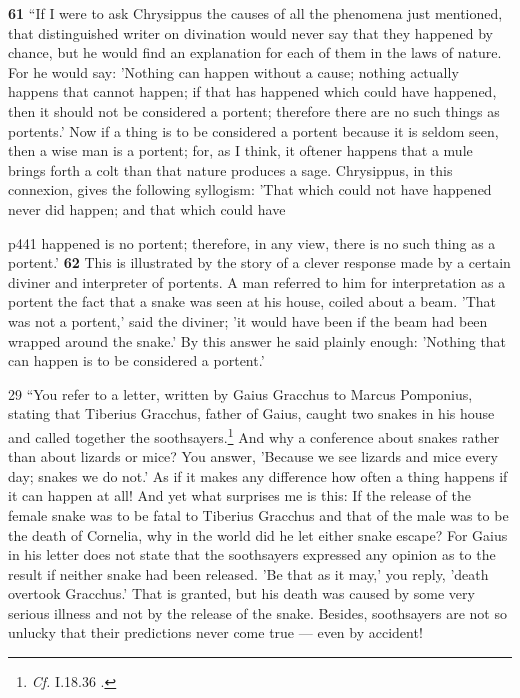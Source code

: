 \textbf{61} ``If I were to ask Chrysippus the causes of all the phenomena just mentioned, that distinguished writer on divination would never say that they happened by chance, but he would find an explanation for each of them in the laws of nature. For he would say: 'Nothing can happen without a cause; nothing actually happens that cannot happen; if that has happened which could have happened, then it should not be considered a portent; therefore there are no such things as portents.' Now if a thing is to be considered a portent because it is seldom seen, then a wise man is a portent; for, as I think, it oftener happens that a mule brings forth a colt than that nature produces a sage. Chrysippus, in this connexion, gives the following syllogism: 'That which could not have happened never did happen; and that which could have

p441 happened is no portent; therefore, in any view, there is no such thing as a portent.' \textbf{62} This is illustrated by the story of a clever response made by a certain diviner and interpreter of portents. A man referred to him for interpretation as a portent the fact that a snake was seen at his house, coiled about a beam. 'That was not a portent,' said the diviner; 'it would have been if the beam had been wrapped around the snake.' By this answer he said plainly enough: 'Nothing that can happen is to be considered a portent.'

29
``You refer to a letter, written by Gaius Gracchus to Marcus Pomponius, stating that Tiberius Gracchus, father of Gaius, caught two snakes in his house and called together the soothsayers.\texthebrew{}\footnote{\emph{Cf.}
I.18.36 .

} And why a conference about snakes rather than about lizards or mice? You answer, 'Because we see lizards and mice every day; snakes we do not.' As if it makes any difference how often a thing happens if it can happen at all! And yet what surprises me is this: If the release of the female snake was to be fatal to Tiberius Gracchus and that of the male was to be the death of Cornelia, why in the world did he let either snake escape? For Gaius in his letter does not state that the soothsayers expressed any opinion as to the result if neither snake had been released. 'Be that as it may,' you reply, 'death overtook Gracchus.' That is granted, but his death was caused by some very serious illness and not by the release of the snake. Besides, soothsayers are not so unlucky that their predictions never come true \texthebrew{—} even by accident!

